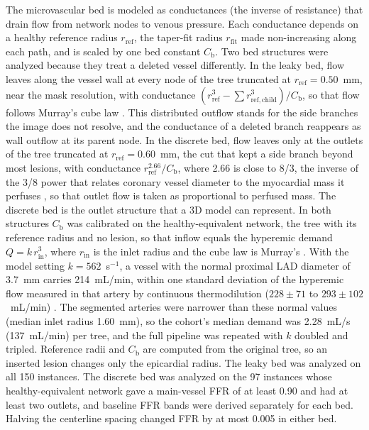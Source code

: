 \documentclass[journal,twoside,web]{ieeecolor}
\begin{document}
The microvascular bed is modeled as conductances (the inverse of resistance) that drain flow from network nodes to
venous pressure. Each conductance depends on a healthy reference radius $r_\mathrm{ref}$, the taper-fit radius
$r_\mathrm{fit}$ made non-increasing along each path, and is scaled by one bed constant $C_\mathrm{b}$. Two bed structures were analyzed because they treat a deleted vessel differently. In the leaky
bed, flow leaves along the vessel wall at every node of the tree truncated at $r_\mathrm{ref} = 0.50$~mm, near the mask resolution, with
conductance $(r_\mathrm{ref}^3 - \sum r_{\mathrm{ref},\mathrm{child}}^3)/C_\mathrm{b}$, so that flow follows Murray's cube law
\cite{murray1926}. This distributed outflow stands for the side branches the image does not resolve, and the
conductance of a deleted branch reappears as wall outflow at its parent node. In the discrete bed, flow leaves only
at the outlets of the tree truncated at $r_\mathrm{ref} = 0.60$~mm, the cut that kept a side branch beyond most lesions, with conductance $r_\mathrm{ref}^{2.66}/C_\mathrm{b}$,
where 2.66 is close to 8/3, the inverse of the 3/8 power that relates coronary vessel diameter to the
myocardial mass it perfuses \cite{choy2008}, so that outlet flow is taken as proportional to perfused mass. The discrete bed is the outlet structure that a 3D model can
represent. In both structures $C_\mathrm{b}$ was calibrated on the healthy-equivalent network, the tree with its reference
radius and no lesion, so that inflow equals the hyperemic demand $Q = k\,r_\mathrm{in}^3$, where $r_\mathrm{in}$ is
the inlet radius and the cube law is Murray's \cite{murray1926}. With the model setting $k = 562$~s$^{-1}$, a
vessel with the normal proximal LAD diameter of 3.7~mm \cite{dodge1992} carries 214~mL/min,
within one standard deviation of the hyperemic flow measured in that artery by continuous thermodilution
($228 \pm 71$ to $293 \pm 102$~mL/min) \cite{fournier2021}. The segmented arteries were narrower than these
normal values (median inlet radius 1.60~mm), so the cohort's median demand was 2.28~mL/s (137~mL/min) per tree, and
the full pipeline was repeated with $k$ doubled and tripled. Reference radii and $C_\mathrm{b}$ are computed from the original tree, so an inserted lesion changes
only the epicardial radius. The leaky bed was analyzed on all 150 instances. The discrete bed was analyzed on the
97 instances whose healthy-equivalent network gave a main-vessel FFR of at least 0.90 and had at least two outlets,
and baseline FFR bands were derived separately for each bed. Halving the centerline spacing changed FFR by at most
0.005 in either bed.
\end{document}
